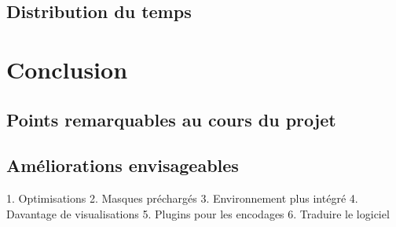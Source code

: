 \documentclass[a4paper,11pt]{article}
\begin{document}
  \subsection{Distribution du temps}
\section{Conclusion}
  \subsection{Points remarquables au cours du projet}
  \subsection{Améliorations envisageables}
    1. Optimisations
    2. Masques préchargés
    3. Environnement plus intégré
    4. Davantage de visualisations
    5. Plugins pour les encodages
    6. Traduire le logiciel

\end{document}
